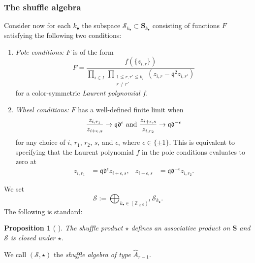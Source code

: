 \documentclass{amsart}
\newcommand{\Z}{\mathbb{Z}}
\newcommand{\qqq}{\mathfrak{q}}
\newcommand{\ddd}{\mathfrak{d}}
\newtheorem{prop}[thm]{Proposition}
\theoremstyle{remark}
\numberwithin{thm}{section}
\numberwithin{equation}{section}
\begin{document}
\subsubsection{The shuffle algebra}
Consider now for each $k_\bullet$ the subspace $\mathcal{S}_{k_\bullet}\subset\mathbf{S}_{k_\bullet}$ consisting of functions $F$ satisfying the following two conditions:
\begin{enumerate}
\item \textit{Pole conditions:} $F$ is of the form
\begin{equation}
F=\frac{f(\{z_{i,r}\})}{\displaystyle \prod_{i\in I}\,\prod_{\substack{1\le r, r'\le k_i\\r\not= r'}}(z_{i,r}-\qqq^2z_{i,r'})}
\label{PoleCond}
\end{equation}
for a color-symmetric \textit{Laurent polynomial} $f$.
\item \textit{Wheel conditions:} $F$ has a well-defined finite limit when
\[\frac{z_{i,r_1}}{z_{i+\epsilon,s}}\rightarrow\qqq\ddd^\epsilon\hbox{ and }\frac{z_{i+\epsilon,s}}{z_{i,r_2}}\rightarrow\qqq\ddd^{-\epsilon}\]
for any choice of $i$, $r_1$, $r_2$, $s$, and $\epsilon$, where $\epsilon\in\{\pm 1\}$. 
This is equivalent to specifying that the Laurent polynomial $f$ in the pole conditions evaluates to zero at
\begin{equation*}
    \begin{aligned}
    z_{i,r_1}&=\qqq\ddd^{\epsilon}z_{i+\epsilon,s},&
    z_{i+\epsilon,s}&=\qqq\ddd^{-\epsilon}z_{i,r_2}.       
    \end{aligned}
\end{equation*}
\end{enumerate}
We set 
\[
\mathcal{S}:=\bigoplus_{k_\bullet\in\left( \Z_{\ge 0} \right)^I}\mathcal{S}_{k_\bullet}.
\]
The following is standard:
\begin{prop}[ ]
The shuffle product $\star$ defines an associative product on $\mathbf{S}$ and $\mathcal{S}$ is closed under $\star$.
\end{prop}
\noindent We call $(\mathcal{S},\star)$ the \textit{shuffle algebra of type }$\hat{A}_{r-1}$.
\end{document}
